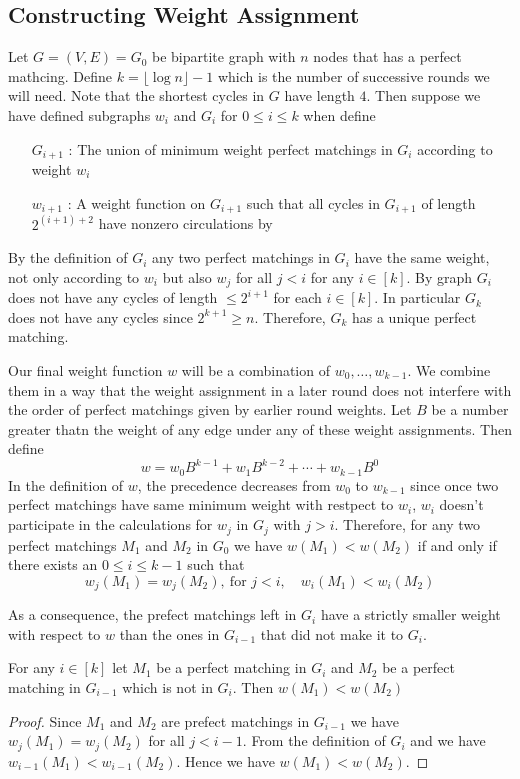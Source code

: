\subsection{Constructing Weight Assignment}
Let $G=(V,E)=G_0$ be bipartite graph with $n$ nodes that has a perfect mathcing. Define $k=\lfloor \log n\rfloor -1$ which is the number of successive rounds we will need. Note that the shortest cycles in $G$ have length $4$. Then suppose we have defined subgraphs $w_i$ and $G_i$ for $0\leq i\leq k$ when define \begin{itemize}
	\item [$G_{i+1}$ :] The union of minimum weight perfect matchings in $G_i$ according to weight $w_i$
	\item [$w_{i+1}$ :] A weight function on $G_{i+1}$ such that all cycles in $G_{i+1}$ of length $2^{(i+1)+2}$ have nonzero circulations by 
\end{itemize}
By the definition of $G_i$ any two perfect matchings in $G_i$ have the same weight, not only according to $w_i$ but also $w_j$ for all $j<i$ for any $i\in[k]$. By  graph $G_i$ does not have any cycles of length $\leq 2^{i+1}$ for each $i\in[k]$. In particular $G_k$ does not have any cycles since $2^{k+1}\geq n$. Therefore, $G_k$ has a unique perfect matching.

Our  final weight function $w$ will be a combination of $w_0,\dots, w_{k-1}$. We combine them in a way that the weight assignment in a later round does not interfere with the order of perfect matchings given by earlier round weights. Let $B$ be a number greater thatn the weight of any edge under any of these weight assignments. Then define $$w=w_0B^{k-1}+w_1B^{k-2}+\cdots + w_{k-1}B^0$$In the definition of $w$, the precedence decreases from $w_0$ to $w_{k-1}$ since once two perfect matchings have same minimum weight with restpect to $w_i$, $w_i$ doesn't participate in the calculations for $w_{j}$ in $G_{j}$ with $j>i$. Therefore, for any two perfect matchings $M_1$ and $M_2$ in $G_0$ we have $w(M_1)<w(M_2)$ if and only if there exists an $0\leq i\leq k-1$ such that $$w_j(M_1)=w_j(M_2),\ \text{for $j<i$},\quad w_i(M_1)<w_i(M_2)$$

As a consequence, the prefect matchings left in $G_i$ have a strictly smaller weight with respect to $w$ than the ones in $G_{i-1}$ that did not make it to $G_i$.
\begin{lemma}{\cite[Lemma 3.5]{FennerGurjarThierauf_2016_Bpm_CONF}}{}
	For any $i\in[k]$ let $M_1$ be a perfect matching in $G_i$ and $M_2$ be a perfect matching in $G_{i-1}$ which is not in $G_i$. Then $w(M_1)<w(M_2)$
\end{lemma}
\begin{proof}
	Since $M_1$ and $M_2$ are prefect matchings in $G_{i-1}$ we have $w_{j}(M_1)=w_{j}(M_2)$ for all $j<i-1$. From the definition of $G_i$ and  we have $w_{i-1}(M_1)<w_{i-1}(M_2)$. Hence we have $w(M_1)<w(M_2)$.
\end{proof}

